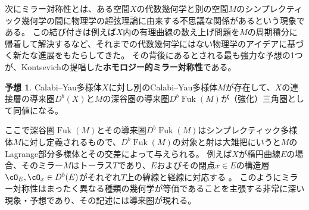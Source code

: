 \documentclass[uplatex,11pt,a4paper,dvipdfmx]{jsarticle}
\numberwithin{equation}{section}
\numberwithin{figure}{section}
\theoremstyle{definition}
\newtheorem{conjecture}[theorem]{予想}
\DeclareMathOperator{\Fuk}{Fuk}
\begin{document}
次にミラー対称性とは、ある空間$X$の代数幾何学と別の空間$M$のシンプレクティック幾何学の間に物理学の超弦理論に由来する不思議な関係があるという現象である。
この結び付きは例えば$X$内の有理曲線の数え上げ問題を$M$の周期積分に帰着して解決するなど、それまでの代数幾何学にはない物理学のアイデアに基づく新たな進展をもたらしてきた。
その背後にあるとされる最も強力な予想の1つが、Kontsevichの提唱した\textbf{ホモロジー的ミラー対称性}である。
\begin{conjecture}
    Calabi--Yau多様体$X$に対し別のCalabi--Yau多様体$M$が存在して、$X$の連接層の導来圏$D^b (X)$と$M$の深谷圏の導来圏$D^b \Fuk(M)$が（強化）三角圏として同値になる。
\end{conjecture}
ここで深谷圏$\Fuk(M)$とその導来圏$D^b \Fuk(M)$はシンプレクティック多様体$M$に対し定義されるもので、$D^b \Fuk(M)$の対象と射は大雑把にいうと$M$のLagrange部分多様体とその交差によって与えられる。
例えば$X$が楕円曲線$E$の場合、そのミラー$M$はトーラス$T$であり、$E$およびその閉点$x \in E$の構造層$\cO_E, \cO_x \in D^b(E)$がそれぞれ$T$上の緯線と経線に対応する \cite{MR1633036}。
このようにミラー対称性はまったく異なる種類の幾何学が等価であることを主張する非常に深い現象・予想であり、その記述には導来圏が現れる。
\end{document}

